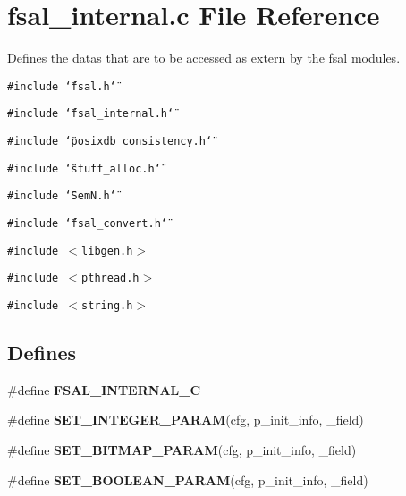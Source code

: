 \section{fsal\_\-internal.c File Reference}
\label{fsal__internal_8c}
Defines the datas that are to be accessed as extern by the fsal modules. 

{\tt \#include \char`\"{}fsal.h\char`\"{}}\par
{\tt \#include \char`\"{}fsal\_\-internal.h\char`\"{}}\par
{\tt \#include \char`\"{}posixdb\_\-consistency.h\char`\"{}}\par
{\tt \#include \char`\"{}stuff\_\-alloc.h\char`\"{}}\par
{\tt \#include \char`\"{}Sem\-N.h\char`\"{}}\par
{\tt \#include \char`\"{}fsal\_\-convert.h\char`\"{}}\par
{\tt \#include $<$libgen.h$>$}\par
{\tt \#include $<$pthread.h$>$}\par
{\tt \#include $<$string.h$>$}\par
\subsection*{Defines}
\begin{CompactItemize}
\item 
\#define {\bf FSAL\_\-INTERNAL\_\-C}\label{fsal__internal_8c_a0}

\item 
\#define {\bf SET\_\-INTEGER\_\-PARAM}(cfg, p\_\-init\_\-info, \_\-field)
\item 
\#define {\bf SET\_\-BITMAP\_\-PARAM}(cfg, p\_\-init\_\-info, \_\-field)
\item 
\#define {\bf SET\_\-BOOLEAN\_\-PARAM}(cfg, p\_\-init\_\-info, \_\-field)
\end{CompactItemize}
